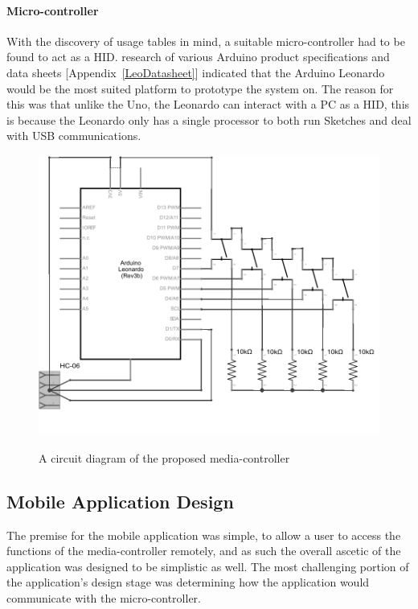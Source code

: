 \documentclass{article}
\begin{document}
			\paragraph{Micro-controller}
			With the discovery of usage tables in mind, a suitable micro-controller had to be found to act as a HID. research of various Arduino product specifications \cite{Uno:online} \cite{Leonardo:online} \cite{LeonardoGuide:online} and data sheets [Appendix~\ref{LeoDatasheet}] indicated that the Arduino Leonardo would be the most suited platform to prototype the system on. The reason for this was that unlike the Uno, the Leonardo can interact with a PC as a HID, this is because the Leonardo only has a single processor to both run Sketches and deal with USB communications.
			
			\begin{figure}[]
				\centering
				\label{mediaController_schem}
				{\includegraphics{mediaController_schem}}
				\caption{A circuit diagram of the proposed media-controller}
				\label{circ}
			\end{figure}
		
		\subsection{Mobile Application Design}
			The premise for the mobile application was simple, to allow a user to access the functions of the media-controller remotely, and as such the overall ascetic of the application was designed to be simplistic as well. The most challenging portion of the application's design stage was determining how the application would communicate with the micro-controller.
			
\end{document}
